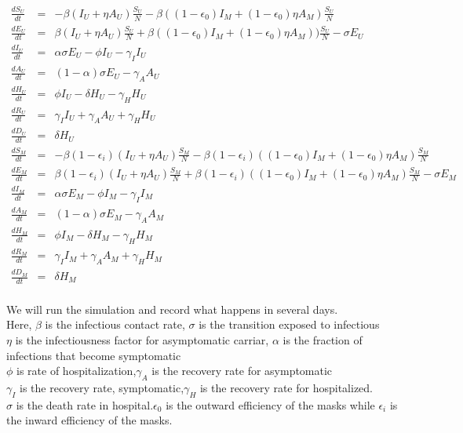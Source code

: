 \documentclass{article}
\begin{document}
\begin{minipage}{0.35\textwidth}
\tiny
\begin{eqnarray}
  \frac{dS_{U}}{dt} &=& -\beta(I_{U}+\eta A_{U})\frac{S_{U}}{N}-\beta((1-\epsilon_{0})I_{M}+(1-\epsilon_{0})\eta A_{M})\frac{S_{U}}{N}\nonumber\\
  \frac{dE_{U}}{dt} &=& \beta(I_{U}+\eta{A}_{U})\frac{S_{U}}{N}+\beta((1-\epsilon_{0})I_{M}+(1-\epsilon_{0})\eta A_{M}))\frac{S_{U}}{N}-\sigma E_{U}\nonumber\\
  \frac{dI_{U}}{dt} &=& \alpha\sigma E_{U}-\phi I_{U} - \gamma_{I}I_{U}\nonumber\\
  \frac{dA_{U}}{dt} &=& (1-\alpha)\sigma E_{U}-\gamma_{A}A_{U}\nonumber\\
  \frac{dH_{U}}{dt} &=& \phi I_{U}-\delta H_{U}-\gamma_{H}H_{U}\nonumber\\
  \frac{dR_{U}}{dt} &=& \gamma_{I}I_{U}+\gamma_{A}A_{U}+\gamma_{H}H_{U}\nonumber\\
  \frac{dD_{U}}{dt} &=& \delta H_{U}\nonumber\\
  \frac{dS_{M}}{dt} &=& -\beta (1-\epsilon_{i})(I_{U}+\eta A_{U})\frac{S_{M}}{N}-\beta(1-\epsilon_{i})((1-\epsilon_{0})I_{M}+(1-\epsilon_{0})\eta A_{M})\frac{S_{M}}{N}\nonumber\\
  \frac{dE_{M}}{dt} &=& \beta(1-\epsilon_{i})(I_{U}+\eta A_{U})\frac{S_{M}}{N}+\beta(1-\epsilon_{i})((1-\epsilon_{0})I_{M}+(1-\epsilon_{0})\eta A_{M})\frac{S_{M}}{N}-\sigma E_{M}\nonumber\\
  \frac{dI_{M}}{dt} &=& \alpha\sigma E_{M}-\phi I_{M}-\gamma_{I} I_{M}\nonumber\\
  \frac{dA_{M}}{dt} &=& (1-\alpha)\sigma E_{M}-\gamma_{A}A_{M}\nonumber\\
  \frac{dH_{M}}{dt} &=& \phi I_{M}-\delta H_{M}-\gamma_{H} H_{M}\nonumber\\
  \frac{dR_{M}}{dt} &=& \gamma_{I}I_{M}+\gamma_{A}A_{M}+\gamma_{H}H_{M}\nonumber\\
  \frac{dD_{M}}{dt} &=& \delta H_{M}\nonumber\\
  \end{eqnarray}
\end{minipage}

We will run the simulation and record what happens in several days. \\Here, $\beta$ is the infectious contact rate, $\sigma$ is the transition exposed to infectious\\$\eta$ is the infectiousness factor for asymptomatic carriar, $\alpha$ is the fraction of infections that become symptomatic\\
$\phi$ is rate of hospitalization,$\gamma_{A}$ is the recovery rate for asymptomatic
\\$\gamma_{I}$ is the recovery rate, symptomatic,$\gamma_{H}$ is the recovery rate for hospitalized.\\$\sigma$ is the death rate in hospital.$\epsilon_{0}$ is the outward efficiency of the masks while $\epsilon_{i}$ is the inward efficiency of the masks.\\
\end{document}

